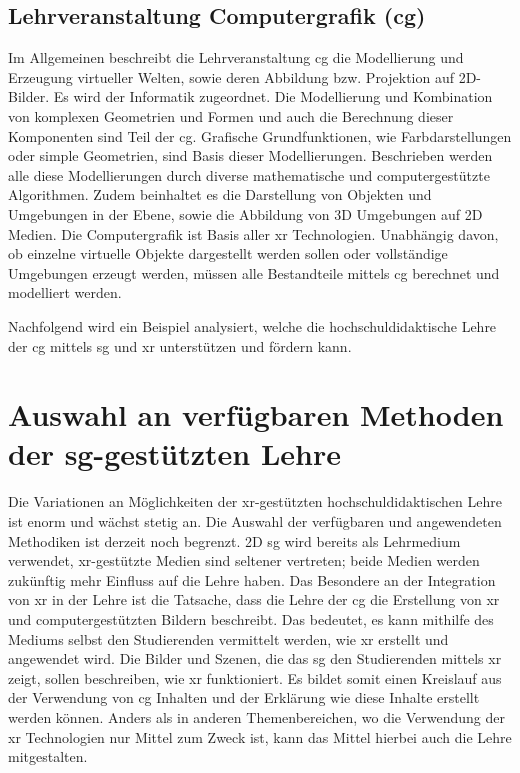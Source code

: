 \documentclass[conference]{IEEEtran}
\begin{document}
\subsection{Lehrveranstaltung Computergrafik (\gls{cg})}
Im Allgemeinen beschreibt die Lehrveranstaltung \gls{cg} die Modellierung und Erzeugung virtueller Welten, sowie deren Abbildung bzw. Projektion auf 2D-Bilder. Es wird der Informatik zugeordnet.
Die Modellierung und Kombination von komplexen Geometrien und Formen und auch die Berechnung dieser Komponenten sind Teil der \gls{cg}.
Grafische Grundfunktionen, wie Farbdarstellungen oder simple Geometrien, sind Basis dieser Modellierungen.
Beschrieben werden alle diese Modellierungen durch diverse mathematische und computergestützte Algorithmen.
Zudem beinhaltet es die Darstellung von Objekten und Umgebungen in der Ebene, sowie die Abbildung von 3D Umgebungen auf 2D Medien.
Die Computergrafik ist Basis aller \gls{xr} Technologien.
Unabhängig davon, ob einzelne virtuelle Objekte dargestellt werden sollen oder vollständige Umgebungen erzeugt werden, müssen alle Bestandteile
mittels \gls{cg} berechnet und modelliert werden.

Nachfolgend wird ein Beispiel analysiert, welche die hochschuldidaktische Lehre der \gls{cg} mittels \gls{sg} und \gls{xr} unterstützen und fördern kann.


\section{Auswahl an verfügbaren Methoden der \gls{sg}-gestützten Lehre}

Die Variationen an Möglichkeiten der \gls{xr}-gestützten hochschuldidaktischen Lehre ist enorm und wächst stetig an\cite{eduxrvrar2020usa}.
Die Auswahl der verfügbaren und angewendeten Methodiken ist derzeit noch begrenzt.
2D \gls{sg} wird bereits als Lehrmedium verwendet, \gls{xr}-gestützte Medien sind seltener vertreten; 
beide Medien werden zukünftig mehr Einfluss auf die Lehre haben.
Das Besondere an der Integration von \gls{xr} in der Lehre ist die Tatsache,
dass die Lehre der \gls{cg} die Erstellung von \gls{xr} und computergestützten Bildern beschreibt.
Das bedeutet, es kann mithilfe des Mediums selbst den Studierenden vermittelt werden, wie \gls{xr} erstellt und angewendet wird.
Die Bilder und Szenen, die das \gls{sg} den Studierenden mittels \gls{xr} zeigt, sollen beschreiben, wie \gls{xr} funktioniert.
Es bildet somit einen Kreislauf aus der Verwendung von \gls{cg} Inhalten und der Erklärung wie diese Inhalte erstellt werden können.
Anders als in anderen Themenbereichen, wo die Verwendung der \gls{xr} Technologien nur Mittel zum Zweck ist, kann das Mittel hierbei auch die Lehre mitgestalten.
\end{document}
